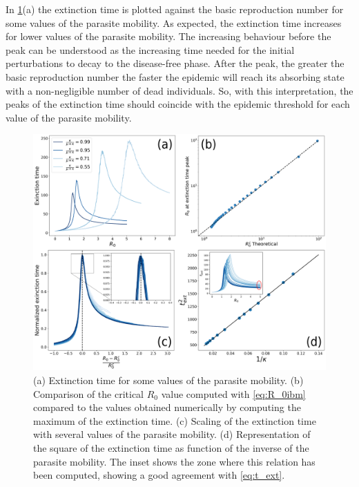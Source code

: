 In \cref{fig:extinction_time}(a) the extinction time is plotted against the
basic reproduction number for some values of the parasite mobility. As
expected, the extinction time increases for lower values of the parasite
mobility. The increasing behaviour before the peak can be understood as the
increasing time needed for the initial perturbations to decay to the
disease-free phase. After the peak, the greater the basic reproduction number
the faster the epidemic will reach its absorbing state with a non-negligible
number of dead individuals. So, with this interpretation, the peaks of the
extinction time should coincide with the epidemic threshold for each value of
the parasite mobility.

\begin{figure}[H]
    \centering
    \includegraphics[width=\textwidth]{Figures/Extinction_time.png}
    \caption{(a) Extinction time for some values of the parasite mobility.
        (b) Comparison of the critical $R_0$ value computed with
        \cref{eq:R_0ibm}
        compared to the values obtained numerically by computing the maximum of
        the
        extinction time. (c) Scaling of the extinction time with several values
        of the
        parasite mobility. (d) Representation of the square of the extinction
        time as
        function of the inverse of the parasite mobility. The inset shows the
        zone
        where this relation has been computed, showing a good agreement with
        \cref{eq:t_ext}.}
    \label{fig:extinction_time}
\end{figure}

